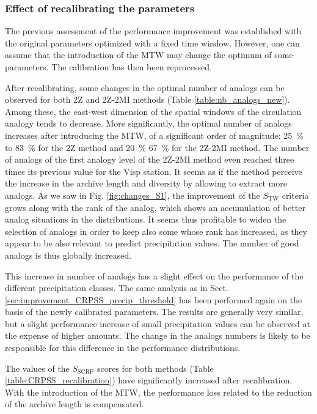 \documentclass[hess, manuscript]{copernicus}
\begin{document}
\subsubsection{Effect of recalibrating the parameters}
\label{sec:recalibration}

The previous assessment of the performance improvement was established with the original parameters optimized with a fixed time window. However, one can assume that the introduction of the MTW may change the optimum of some parameters. The calibration has then been reprocessed.

After recalibrating, some changes in the optimal number of analogs can be observed for both 2Z and 2Z-2MI methods (Table \ref{table:nb_analogs_new}). Among these, the east-west dimension of the spatial windows of the circulation analogy tends to decrease. More significantly, the optimal number of analogs increases after introducing the MTW, of a significant order of magnitude: 25~\% to 83~\% for the 2Z method and 20~\% 67~\% for the 2Z-2MI method. The number of analogs of the first analogy level of the 2Z-2MI method even reached three times its previous value for the Visp station. It seems as if the method perceive the increase in the archive length and diversity by allowing to extract more analogs. As we saw in Fig. \ref{fig:changes_S1}, the improvement of the $S_{\text{TW}}$ criteria grows along with the rank of the analog, which shows an accumulation of better analog situations in the distributions. It seems thus profitable to widen the selection of analogs in order to keep also some whose rank has increased, as they appear to be also relevant to predict precipitation values. The number of good analogs is thus globally increased.

This increase in number of analogs has a slight effect on the performance of the different precipitation classes. The same analysis as in Sect. \ref{sec:improvement_CRPSS_precip_threshold} has been performed again on the basis of the newly calibrated parameters. The results are generally very similar, but a slight performance increase of small precipitation values can be observed at the expense of higher amounts. The change in the analogs numbers is likely to be responsible for this difference in the performance distributions.

The values of the $S_{\text{SCRP}}$ scores for both methods (Table \ref{table:CRPSS_recalibration}) have significantly increased after recalibration. With the introduction of the MTW, the performance loss related to the reduction of the archive length is compensated.
\end{document}

